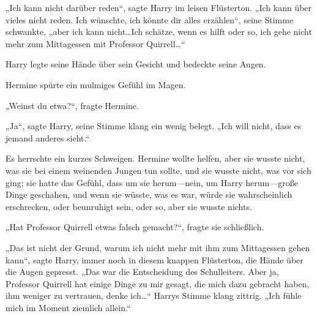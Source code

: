 „Ich kann nicht darüber reden“, sagte Harry im leisen Flüsterton. „Ich kann über vieles nicht reden. Ich wünschte, ich könnte dir alles erzählen“, seine Stimme schwankte, „aber ich kann nicht…Ich schätze, wenn es hilft oder so, ich gehe nicht mehr zum Mittagessen mit Professor Quirrell…“

Harry legte seine Hände über sein Gesicht und bedeckte seine Augen.

Hermine spürte ein mulmiges Gefühl im Magen.

„Weinst du etwa?“, fragte Hermine.

„Ja“, sagte Harry, seine Stimme klang ein wenig belegt. „Ich will nicht, dass es jemand anderes sieht.“

Es herrschte ein kurzes Schweigen. Hermine wollte helfen, aber sie wusste nicht, was sie bei einem weinenden Jungen tun sollte, und sie wusste nicht, was vor sich ging; sie hatte das Gefühl, dass um sie herum—nein, um Harry herum—große Dinge geschahen, und wenn sie wüsste, was es war, würde sie wahrscheinlich erschrecken, oder beunruhigt sein, oder so, aber sie wusste nichts.

„Hat Professor Quirrell etwas falsch gemacht?“, fragte sie schließlich.

„Das ist nicht der Grund, warum ich nicht mehr mit ihm zum Mittagessen gehen kann“, sagte Harry, immer noch in diesem knappen Flüsterton, die Hände über die Augen gepresst. „Das war die Entscheidung des Schulleiters. Aber ja, Professor Quirrell hat einige Dinge zu mir gesagt, die mich dazu gebracht haben, ihm weniger zu vertrauen, denke ich…“ Harrys Stimme klang zittrig. „Ich fühle mich im Moment ziemlich allein.“

